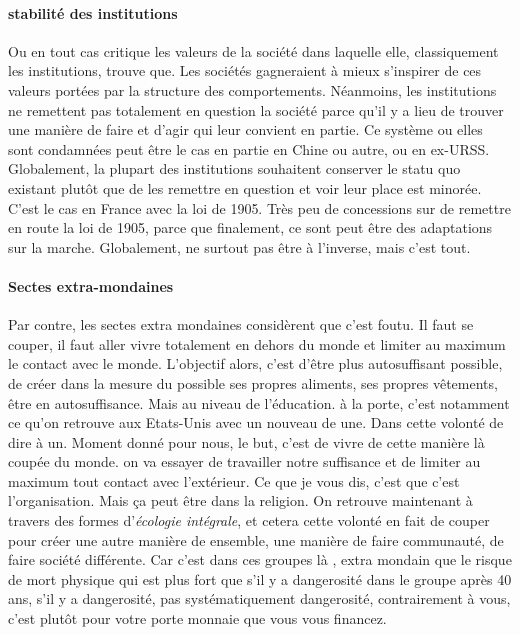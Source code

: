    

\paragraph{stabilité des institutions}
Ou en tout cas critique les valeurs de la société dans laquelle elle, classiquement les institutions, trouve que.
Les sociétés gagneraient à  mieux s'inspirer de ces valeurs portées par la structure des comportements. Néanmoins, les institutions ne remettent pas totalement en question la société parce qu'il y a lieu de trouver une manière de faire et d'agir qui leur convient en partie.
Ce système ou elles sont condamnées peut être le cas en partie en Chine ou autre, ou en ex-URSS.
Globalement, la plupart des institutions souhaitent conserver le statu quo existant plutôt que de les remettre en question et voir leur place est minorée. C'est le cas en France avec la loi de 1905. Très peu de concessions sur de remettre en route la loi de 1905, parce que finalement, ce sont peut être des adaptations sur la marche. Globalement, ne surtout pas être à  l'inverse, mais c'est tout.


\paragraph{Sectes extra-mondaines}
Par contre, les sectes extra mondaines considèrent que c'est foutu. Il faut se couper, il faut aller vivre totalement en dehors du monde et limiter au maximum le contact avec le monde.
L'objectif alors, c'est d'être plus autosuffisant possible, de créer dans la mesure du possible ses propres aliments, ses propres vêtements, être en autosuffisance. Mais au niveau de l'éducation.
à la porte, c'est notamment ce qu'on retrouve aux Etats-Unis avec un nouveau de une. Dans cette volonté de dire à  un.
Moment donné pour nous, le but, c'est de vivre de cette manière là  coupée du monde.  on va essayer de travailler notre suffisance et de limiter au maximum tout contact avec l'extérieur. Ce que je vous dis, c'est que c'est l'organisation.
Mais ça peut être dans la religion. On retrouve maintenant à  travers des formes d'\textit{écologie intégrale}, et cetera cette volonté en fait de couper pour créer une autre manière de ensemble, une manière de faire communauté, de faire société différente. Car c'est dans ces groupes là , extra mondain que le risque de mort physique qui est plus fort que s'il y a dangerosité dans le groupe après 40 ans, s'il y a dangerosité, pas systématiquement dangerosité, contrairement à vous, c'est plutôt pour votre porte monnaie que vous vous financez.
 

